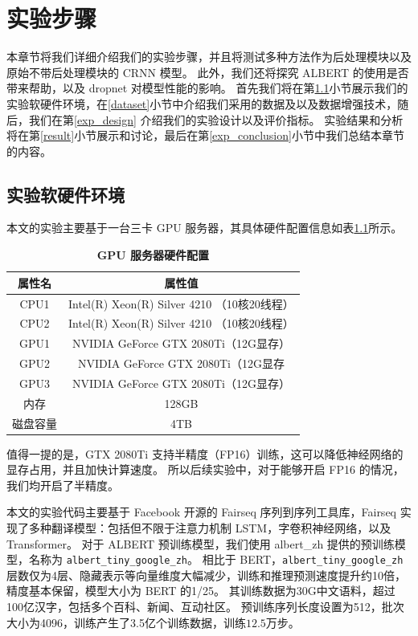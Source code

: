 \chapter{实验步骤}
\label{chap:experiments}
本章节将我们详细介绍我们的实验步骤，并且将测试多种方法作为后处理模块以及原始不带后处理模块的 CRNN 模型。
此外，我们还将探究 ALBERT 的使用是否带来帮助，以及 dropnet 对模型性能的影响。
首先我们将在第\ref{exp_env}小节展示我们的实验软硬件环境，在\ref{dataset}小节中介绍我们采用的数据及以及数据增强技术，随后，我们在第\ref{exp_design} 介绍我们的实验设计以及评价指标。
实验结果和分析将在第\ref{result}小节展示和讨论，最后在第\ref{exp_conclusion}小节中我们总结本章节的内容。

\section{实验软硬件环境}
\label{exp_env}
本文的实验主要基于一台三卡 GPU 服务器，其具体硬件配置信息如表\ref{tab:conf}所示。

\begin{table}[!hpt]
	\caption[]{\textbf{GPU 服务器硬件配置}}
	\label{tab:conf}
	\centering
	\begin{tabular}{c c}
		\hline
		\textbf{属性名} & \textbf{属性值} \\ [0.5ex] 
		\hline
		CPU1 & Intel(R) Xeon(R) Silver 4210 （10核20线程） \\
		CPU2 & Intel(R) Xeon(R) Silver 4210 （10核20线程） \\
		GPU1 & NVIDIA GeForce GTX 2080Ti（12G显存） \\
		GPU2 & NVIDIA GeForce GTX 2080Ti（12G显存 \\
		GPU3 & NVIDIA GeForce GTX 2080Ti（12G显存）\\
		内存 & 128GB \\
		磁盘容量 & 4TB \\
		\hline
	\end{tabular}
\end{table}

值得一提的是，GTX 2080Ti 支持半精度（FP16）训练，这可以降低神经网络的显存占用，并且加快计算速度。
所以后续实验中，对于能够开启 FP16 的情况，我们均开启了半精度。

本文的实验代码主要基于 Facebook 开源的 Fairseq\cite{ott2019fairseq} 序列到序列工具库，Fairseq 实现了多种翻译模型：包括但不限于注意力机制 LSTM\cite{attn_lstm}，字卷积神经网络\cite{cs2s}，以及 Transformer\cite{transformer}。
对于 ALBERT 预训练模型，我们使用 albert\_zh 提供的预训练模型，名称为 \texttt{albert\_tiny\_google\_zh}。
相比于 BERT，\texttt{albert\_tiny\_google\_zh} 层数仅为4层、隐藏表示等向量维度大幅减少，训练和推理预测速度提升约10倍，精度基本保留，模型大小为 BERT 的1/25。
其训练数据为30G中文语料，超过100亿汉字，包括多个百科、新闻、互动社区。
预训练序列长度设置为512，批次大小为4096，训练产生了3.5亿个训练数据，训练$12.5$万步。

